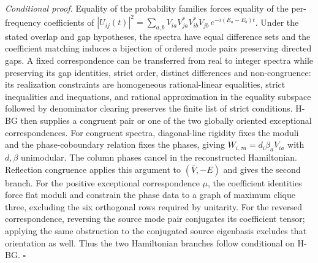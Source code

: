 \documentclass[
]{article}
\begin{document}
\emph{Conditional proof.} Equality of the probability families forces
equality of the per-frequency coefficients of
\(|U_{ij}(t)|^2 = \sum_{a,b} V_{ia} V_{ja}^* V_{ib}^* V_{jb}\, e^{-i(E_a-E_b)t}\).
Under the stated overlap and gap hypotheses, the spectra have equal
difference sets and the coefficient matching induces a bijection of
ordered mode pairs preserving directed gaps. A fixed correspondence can
be transferred from real to integer spectra while preserving its gap
identities, strict order, distinct differences and non-congruence: its
realization constraints are homogeneous rational-linear equalities,
strict inequalities and inequations, and rational approximation in the
equality subspace followed by denominator clearing preserves the finite
list of strict conditions. H-BG then supplies a congruent pair or one of
the two globally oriented exceptional correspondences. For congruent
spectra, diagonal-line rigidity fixes the moduli and the
phase-coboundary relation fixes the phases, giving
\(W_{i,\tau a}=d_i\beta_a V_{ia}\) with \(d,\beta\) unimodular. The
column phases cancel in the reconstructed Hamiltonian. Reflection
congruence applies this argument to \((\bar V,-E)\) and gives the second
branch. For the positive exceptional correspondence \(\mu\), the
coefficient identities force flat moduli and constrain the phase data to
a graph of maximum clique three, excluding the six orthogonal rows
required by unitarity. For the reversed correspondence, reversing the
source mode pair conjugates its coefficient tensor; applying the same
obstruction to the conjugated source eigenbasis excludes that
orientation as well. Thus the two Hamiltonian branches follow
conditional on H-BG. \(\square\)
\end{document}
